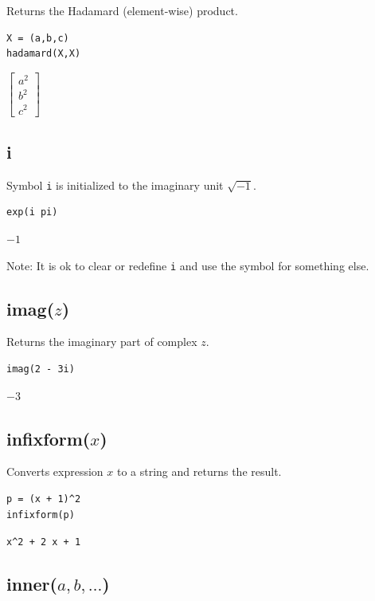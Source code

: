 \documentclass[12pt]{article}
\begin{document}
Returns the Hadamard (element-wise) product.

{\color{blue}
\begin{verbatim}
X = (a,b,c)
hadamard(X,X)
\end{verbatim}
}

\noindent
$\displaystyle
\begin{bmatrix}
a^2
\\[1ex]
b^2
\\[1ex]
c^2
\end{bmatrix}
$

\subsection*{i}

Symbol {\tt i} is initialized to the imaginary unit $\sqrt{-1}$.

{\color{blue}
\begin{verbatim}
exp(i pi)
\end{verbatim}
}

\noindent
$-1$

\bigskip
\noindent
Note: It is ok to clear or redefine {\tt i} and use the symbol for something else.

\subsection*{imag($z$)}

Returns the imaginary part of complex $z$.

{\color{blue}
\begin{verbatim}
imag(2 - 3i)
\end{verbatim}
}

\noindent
$-3$

\subsection*{infixform($x$)}

Converts expression $x$ to a string and returns the result.

{\color{blue}
\begin{verbatim}
p = (x + 1)^2
infixform(p)
\end{verbatim}
}

\noindent
\verb$x^2 + 2 x + 1$

\subsection*{inner($a,b,\ldots$)}
\end{document}
